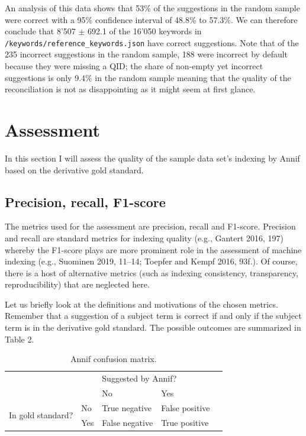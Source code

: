 An analysis of this data shows that 53\% of the suggestions in the
random sample were correct with a 95\% confidence interval of 48.8\% to
57.3\%. We can therefore conclude that 8'507 \(\pm\) 692.1 of the 16'050
keywords in \texttt{/keywords/reference\_keywords.json} have correct
suggestions. Note that of the 235 incorrect suggestions in the random
sample, 188 were incorrect by default because they were missing a QID;
the share of non-empty yet incorrect suggestions is only 9.4\% in the
random sample meaning that the quality of the reconciliation is not as
disappointing as it might seem at first glance.

\hypertarget{assessment}{%
\section{Assessment}\label{assessment}}

In this section I will assess the quality of the sample data set's
indexing by Annif based on the derivative gold standard.

\hypertarget{precision-recall-f1-score}{%
\subsection{Precision, recall,
F1-score}\label{precision-recall-f1-score}}

The metrics used for the assessment are precision, recall and F1-score.
Precision and recall are standard metrics for indexing quality (e.g.,
Gantert 2016, 197) whereby the F1-score plays are more prominent role in
the assessment of machine indexing (e.g., Suominen 2019, 11--14; Toepfer
and Kempf 2016, 93f.). Of course, there is a host of alternative metrics
(such as indexing consistency, transparency, reproducibility) that are
neglected here.

Let us briefly look at the definitions and motivations of the chosen
metrics. Remember that a suggestion of a subject term is correct if and
only if the subject term is in the derivative gold standard. The
possible outcomes are summarized in Table 2.

\begin{table}[h]
\centering
\begin{tabular}{lllll}
 &                       & \multicolumn{2}{l}{Suggested by Annif?}            &  \\ \cline{3-4}
 & \multicolumn{1}{l|}{} & \multicolumn{1}{l|}{No} & \multicolumn{1}{l|}{Yes} &  \\ \cline{2-4}
\multicolumn{1}{l|}{\multirow{2}{*}{In gold standard?}} & \multicolumn{1}{l|}{No}  & \multicolumn{1}{l|}{True negative}  & \multicolumn{1}{l|}{False positive} &  \\ \cline{2-4}
\multicolumn{1}{l|}{}                                   & \multicolumn{1}{l|}{Yes} & \multicolumn{1}{l|}{False negative} & \multicolumn{1}{l|}{True positive}  &  \\ \cline{2-4}
\end{tabular}
\caption{Annif confusion matrix.}
\label{tab:confusion-matrix}
\end{table}

